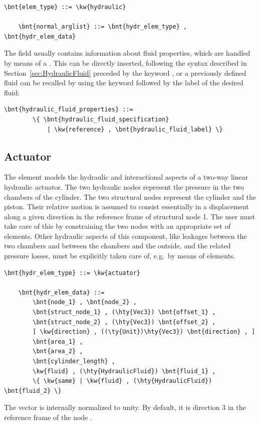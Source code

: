 \begin{Verbatim}[commandchars=\\\{\}]
    \bnt{elem_type} ::= \kw{hydraulic}

    \bnt{normal_arglist} ::= \bnt{hydr_elem_type} , \bnt{hydr_elem_data}
\end{Verbatim}
The field  usually contains information
about fluid properties, which are handled by means of a .
This can be directly inserted, following the syntax described in
Section~\ref{sec:HydraulicFluid} preceded by the keyword , or a
previously defined fluid can be recalled by using the keyword 
 followed by the label of the desired fluid:
\begin{Verbatim}[commandchars=\\\{\}]
    \bnt{hydraulic_fluid_properties} ::=
        \{ \bnt{hydraulic_fluid_specification}
            | \kw{reference} , \bnt{hydraulic_fluid_label} \}
\end{Verbatim}

\subsection{Actuator}
The  element models the hydraulic and interactional aspects
of a two-way linear hydraulic actuator.
The two hydraulic nodes represent the pressure in the two chambers
of the cylinder.
The two structural nodes represent the cylinder and the piston.
Their relative motion is assumed to consist essentially
in a displacement along a given direction in the reference frame
of structural node 1.
The user must take care of this by constraining the two nodes
with an appropriate set of  elements.
Other hydraulic aspects of this component, like leakages between
the two chambers and between the chambers and the outside,
and the related pressure losses, must be explicitly taken care of,
e.g.\ by means of  elements.
\label{sec:EL:HYDR:ACTUATOR}
\begin{Verbatim}[commandchars=\\\{\}]
    \bnt{hydr_elem_type} ::= \kw{actuator}

    \bnt{hydr_elem_data} ::=
        \bnt{node_1} , \bnt{node_2} , 
        \bnt{struct_node_1} , (\hty{Vec3}) \bnt{offset_1} ,
        \bnt{struct_node_2} , (\hty{Vec3}) \bnt{offset_2} ,
        [ \kw{direction} , ((\ty{Unit})\hty{Vec3}) \bnt{direction} , ]
        \bnt{area_1} ,
        \bnt{area_2} ,
        \bnt{cylinder_length} ,
        \kw{fluid} , (\hty{HydraulicFluid}) \bnt{fluid_1} ,
        \{ \kw{same} | \kw{fluid} , (\hty{HydraulicFluid}) \bnt{fluid_2} \}
\end{Verbatim}
The vector  is internally normalized to unity.
By default, it is direction 3 in the reference frame of the 
node .

